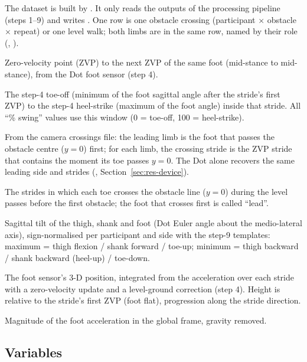 The dataset is built by . It only reads the outputs of the processing pipeline
(steps 1--9) and writes . One row is one obstacle crossing (participant $\times$ obstacle $\times$
repeat) or one level walk; both limbs are in the same row, named by their role (, ).

\begin{description}[leftmargin=0.4cm,style=nextline]
  \item[Stride] Zero-velocity point (ZVP) to the next ZVP of the same foot (mid-stance to mid-stance), from the Dot foot
  sensor (step 4).
  \item[Swing] The step-4 toe-off (minimum of the foot sagittal angle after the stride's first ZVP) to the step-4
  heel-strike (maximum of the foot angle) inside that stride. All ``\% swing'' values use this window
  (0 = toe-off, 100 = heel-strike).
  \item[Crossing stride and roles] From the camera crossings file: the leading limb is the foot that passes the obstacle
  centre ($y = 0$) first; for each limb, the crossing stride is the ZVP stride that contains the moment its toe passes
  $y = 0$. The Dot alone recovers the same leading side and strides (, Section~\ref{sec:res-device}).
  \item[Level walks] The strides in which each toe crosses the obstacle line ($y = 0$) during the level passes before the
  first obstacle; the foot that crosses first is called ``lead''.
  \item[Segment angles] Sagittal tilt of the thigh, shank and foot (Dot Euler angle about the medio-lateral axis),
  sign-normalised per participant and side with the step-9 templates: maximum = thigh flexion / shank forward /
  toe-up; minimum = thigh backward / shank backward (heel-up) / toe-down.
  \item[Foot trajectory (ZHC)] The foot sensor's 3-D position, integrated from the acceleration over each stride with a
  zero-velocity update and a level-ground correction (step 4). Height is relative to the stride's first ZVP
  (foot flat), progression along the stride direction.
  \item[Foot acceleration] Magnitude of the foot acceleration in the global frame, gravity removed.
\end{description}

\subsection{Variables}
\label{sec:variables}

